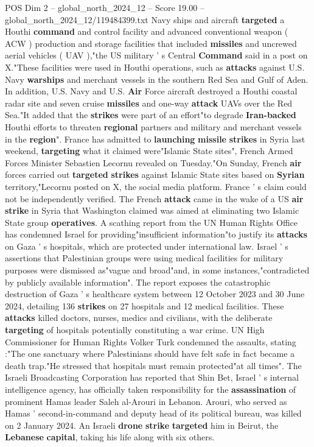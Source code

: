 \begin{textsample}{POS Dim 2 – global\_north\_2024\_12 – Score 19.00 – global\_north\_2024\_12/119484399.txt}
Navy ships and aircraft \textbf{targeted} a Houthi \textbf{command} and control facility and advanced conventional weapon ( ACW ) production and storage facilities that included \textbf{missiles} and uncrewed aerial vehicles ( UAV ),"the US military ' s Central \textbf{Command} said in a post on X."These facilities were used in Houthi operations, such as \textbf{attacks} against U.S.
Navy \textbf{warships} and merchant vessels in the southern Red Sea and Gulf of Aden.
In addition, U.S.
Navy and U.S. \textbf{Air} Force aircraft destroyed a Houthi coastal radar site and seven cruise \textbf{missiles} and one-way \textbf{attack} UAVs over the Red Sea."It added that the \textbf{strikes} were part of an effort"to degrade \textbf{Iran-backed} Houthi efforts to threaten \textbf{regional} partners and military and merchant vessels in the \textbf{region}".
France has admitted to \textbf{launching} \textbf{missile} \textbf{strikes} in Syria last weekend, \textbf{targeting} what it claimed were"Islamic State sites", French Armed Forces Minister Sebastien Lecornu revealed on Tuesday."On Sunday, French \textbf{air} forces carried out \textbf{targeted} \textbf{strikes} against Islamic State sites based on \textbf{Syrian} territory,"Lecornu posted on X, the social media platform.
France ' s claim could not be independently verified.
The French \textbf{attack} came in the wake of a US \textbf{air} \textbf{strike} in Syria that Washington claimed was aimed at eliminating two Islamic State group \textbf{operatives}.
A scathing report from the UN Human Rights Office has condemned Israel for providing"insufficient information"to justify its \textbf{attacks} on Gaza ' s hospitals, which are protected under international law.
Israel ' s assertions that Palestinian groups were using medical facilities for military purposes were dismissed as"vague and broad"and, in some instances,"contradicted by publicly available information".
The report exposes the catastrophic destruction of Gaza ' s healthcare system between 12 October 2023 and 30 June 2024, detailing 136 \textbf{strikes} on 27 hospitals and 12 medical facilities.
These \textbf{attacks} killed doctors, nurses, medics and civilians, with the deliberate \textbf{targeting} of hospitals potentially constituting a war crime.
UN High Commissioner for Human Rights Volker Turk condemned the assaults, stating :"The one sanctuary where Palestinians should have felt safe in fact became a death trap."He stressed that hospitals must remain protected"at all times".
The Israeli Broadcasting Corporation has reported that Shin Bet, Israel ' s internal intelligence agency, has officially taken responsibility for the \textbf{assassination} of prominent Hamas leader Saleh al-Arouri in Lebanon.
Arouri, who served as Hamas ' second-in-command and deputy head of its political bureau, was killed on 2 January 2024.
An Israeli \textbf{drone} \textbf{strike} \textbf{targeted} him in Beirut, the \textbf{Lebanese} \textbf{capital}, taking his life along with six others.

\end{textsample}
